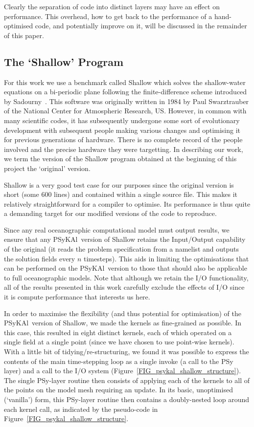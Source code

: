 \documentclass{IOS-Book-Article}
\newcommand{\psykal}{{PS}y{KA}l}
\begin{document}
Clearly the separation of code into distinct layers may have an effect
on performance. This overhead, how to get back to the performance
of a hand-optimised code, and potentially improve on it, will be
discussed in the remainder of this paper.

\subsection*{The `Shallow' Program}

For this work we use a benchmark called Shallow which solves the
shallow-water equations on a bi-periodic plane following the
finite-difference scheme introduced by Sadourny~\cite{sadourny75}.
This software was originally written in 1984 by Paul Swarztrauber of
the National Center for Atmospheric Research, US.  However, in common
with many scientific codes, it has subsequently undergone some sort of
evolutionary development with subsequent people making various changes
and optimising it for previous generations of hardware.  There is no
complete record of the people involved and the precise hardware they
were targetting. In describing our work, we term the version of the
Shallow program obtained at the beginning of this project the
`original' version.

Shallow is a very good test case for our purposes since the original
version is short (some 600 lines) and contained within a single source
file. This makes it relatively straightforward for a compiler to
optimise. Its performance is thus quite a demanding target for our
modified versions of the code to reproduce.

Since any real oceanographic computational model must output results,
we ensure that any \psykal\ version of Shallow retains the Input/Output
capability of the original (it reads the problem specification from a
namelist and outputs the solution fields every $n$ timesteps). This
aids in limiting the optimisations that can be performed on the
\psykal\ version to those that should also be applicable to full
oceanographic models. Note that although we retain the I/O
functionality, all of the results presented in this work carefully
exclude the effects of I/O since it is compute performance that
interests us here.

In order to maximise the flexibility (and thus potential for
optimisation) of the \psykal\ version of Shallow, we made the kernels
as fine-grained as possible. In this case, this resulted in eight
distinct kernels, each of which operated on a single field at a single
point (since we have chosen to use point-wise kernels). With a little
bit of tidying/re-structuring, we found it was possible to express the
contents of the main time-stepping loop as a single invoke (a call to
the PSy layer) and a call to the I/O system
(Figure~\ref{FIG_psykal_shallow_structure}). The single PSy-layer
routine then consists of applying each of the kernels to all of the
points on the model mesh requiring an update. In its basic,
unoptimised (`vanilla') form, this PSy-layer routine then contains a
doubly-nested loop around each kernel call, as indicated by the
pseudo-code in Figure~\ref{FIG_psykal_shallow_structure}.
\end{document}
